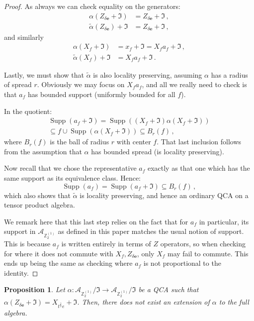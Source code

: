 \documentclass[aps,twocolumn,prx,floatfix,preprintnumbers, nofootinbib,10pt]{revtex4-2}
\numberwithin{equation}{section}
\newtheorem{proposition}[theorem]{Proposition}
\theoremstyle{definition}
\theoremstyle{remark}
\theoremstyle{claim}
\newcommand{\be}{\begin{equation}}
\newcommand{\ee}{\end{equation}}
\newcommand{\Z}{{\mathbb Z}}
\newcommand{\mc}[1]{\mathcal{#1}}
\newcommand{\paren}[1]{\left( #1 \right)}
\begin{document}
\begin{proof}
 As always we can check equality on the generators:
 \begin{align}
  \alpha(Z_{\delta \bm{e}} + \mathfrak{I}) &= Z_{\delta \bm{e}} + \mathfrak{I} \,, \\
  \tilde{\alpha}(Z_{\delta \bm{e}}) + \mathfrak{I} &= Z_{\delta \bm{e}} + \mathfrak{I} \,,
 \end{align}
 and similarly
 \begin{align}
  \alpha(X_f + \mathfrak{I}) &= x_f + \mathfrak{I} = X_f a_f + \mathfrak{I} \,, \\
  \tilde{\alpha}(X_f) + \mathfrak{I} &= X_f a_f + \mathfrak{I} \,.
 \end{align}

 Lastly, we must show that $\tilde{\alpha}$ is also locality preserving, assuming $\alpha$ has a radius of spread $r$. Obviously we may focus on $X_f a_f$, and all we really need to check is that $a_f$ has bounded support (uniformly bounded for all $f$).

 In the quotient:
 \begin{multline}
  \operatorname{Supp}(a_f + \mathfrak{I}) = \operatorname{Supp}\paren{(X_f + \mathfrak{I}) \alpha(X_f + \mathfrak{I})} \\
  \subseteq f \cup \operatorname{Supp}(\alpha(X_f + \mathfrak{I})) \subseteq B_r(f) \,,
 \end{multline}
 where $B_r(f)$ is the ball of radius $r$ with center $f$. That last inclusion follows from the assumption that $\alpha$ has bounded spread (is locality preserving).

 Now recall that we chose the representative $a_f$ exactly as that one which has the same support as its equivalence class. Hence:
 \be
 \operatorname{Supp}(a_f) = \operatorname{Supp}(a_f + \mathfrak{I}) \subseteq B_r(f) \,,
 \ee
 which also shows that $\tilde{\alpha}$ is locality preserving, and hence an ordinary QCA on a tensor product algebra.

 We remark here that this last step relies on the fact that for $a_f$ in particular, its support in $\mc{A}_{\Z_2^{(1)}}$ as defined in this paper matches the usual notion of support. This is because $a_f$ is written entirely in terms of $Z$ operators, so when checking for where it does not commute with $X_f, Z_{\delta \bm{e}}$, only $X_f$ may fail to commute. This ends up being the same as checking where $a_f$ is not proportional to the identity.
\end{proof}

\begin{proposition}\label{prop:qca_nonextendability}
 Let $\alpha : \mc{A}_{\Z_2^{(1)}} / \mathfrak{I} \rightarrow \mc{A}_{\Z_2^{(1)}} / \mathfrak{I}$ be a QCA such that $\alpha(Z_{\delta \bm{e}} + \mathfrak{I}) = X_{t^\frac{1}{2} e} + \mathfrak{I}$.
 Then, there does not exist an extension of $\alpha$ to the full algebra.
\end{proposition}
\end{document}
